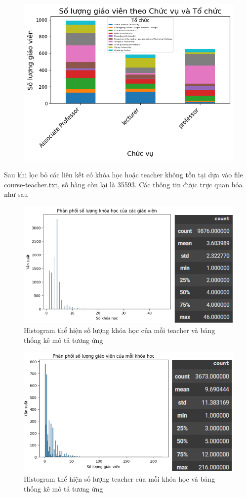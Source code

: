 \newpage
\begin{figure}
    \centering
    \includegraphics[width=0.65\linewidth]{figures/31.png}
\end{figure}
Sau khi lọc bỏ các liên kết có khóa học hoặc teacher không tồn tại dựa vào file course-teacher.txt, số hàng còn lại là 35593. Các thông tin được trực quan hóa như sau
\begin{figure}[h]
    \centering
    \includegraphics[width=0.8\linewidth]{figures/32.png}
    \caption{Histogram thể hiện số lượng khóa học của mỗi teacher và bảng thống kê mô tả tương ứng}
\end{figure}
\newpage
\begin{figure}
    \centering
    \includegraphics[width=0.8\linewidth]{figures/33.png}
    \caption{Histogram thể hiện số lượng teacher của mỗi khóa học và bảng thống kê mô tả tương ứng}
\end{figure}
